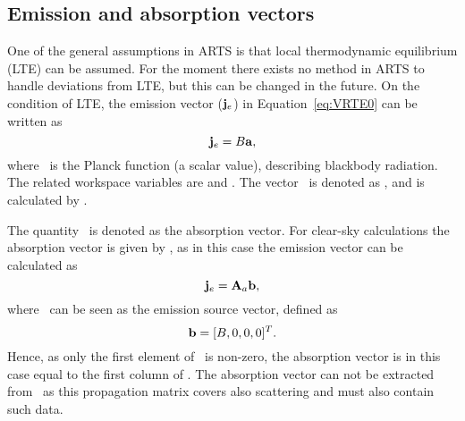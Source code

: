 


\subsection{Emission and absorption vectors}
\label{sec:rteq:evec}

One of the general assumptions in ARTS is that local thermodynamic equilibrium
(LTE) can be assumed. For the moment there exists no method in ARTS to handle
deviations from LTE, but this can be changed in the future.
On the condition of LTE, the emission vector ($\mathbf{j}_e$) in
Equation~\ref{eq:VRTE0} can be written as
\begin{equation}
  \label{eq:evec1}
  {\bf j}_{e} = B {\bf a},
\end{equation}
where \Planck\ is the Planck function (a scalar value), describing blackbody
radiation. The related workspace variables are 
and . The vector \ is
denoted as , and is calculated by
.

The quantity \AbsVec\ is denoted as the absorption vector. For clear-sky
calculations the absorption vector is given by , as in this case the
emission vector can be calculated as
\begin{equation}
  \label{eq:evec2}
  {\bf j}_{e} = {\bf A}_{a}{\bf b},
\end{equation}
where \EmsVec\ can be seen as the emission source vector, defined as
\begin{equation}
  {\bf b} = [B,0,0,0]^T.
\end{equation}
Hence, as only the first element of \EmsVec\ is non-zero, the absorption
vector is in this case equal to the first column of .
The absorption vector can not be extracted from \ as this
propagation matrix covers also scattering and 
must also contain such data.

